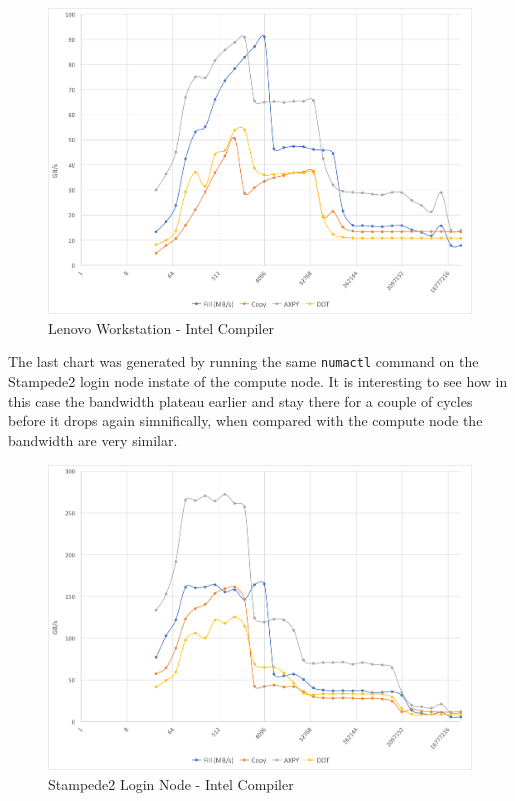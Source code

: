 \documentclass[12pt]{article} %
\begin{document}
\begin{figure}[htb]
\caption{Lenovo Workstation - Intel Compiler}\label{fig:benchmark04}
\centering
\includegraphics[width=\textwidth,keepaspectratio]{imgs/img04.png}
\end{figure}

\newpage

The last chart was generated by running the same \verb|numactl| command on the Stampede2 login node instate of the compute node. It is interesting to see how in this case the bandwidth plateau earlier and stay there for a couple of cycles before it drops again simnifically, when compared with the compute node the bandwidth are very similar.  

\begin{figure}[htb]
\caption{Stampede2 Login Node - Intel Compiler}\label{fig:benchmark05}
\centering
\includegraphics[width=\textwidth,keepaspectratio]{imgs/img05.png}
\end{figure}
\end{document}
